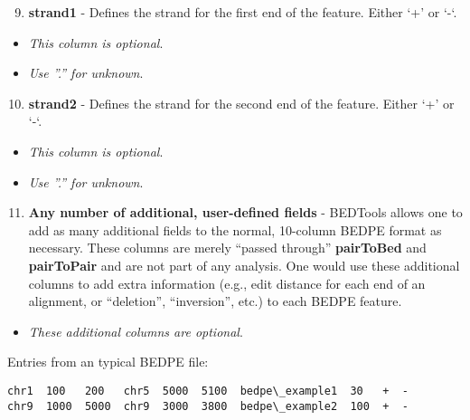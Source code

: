 \documentclass[letterpaper,10pt,english]{sphinxmanual}
\begin{document}
\begin{enumerate}
\setcounter{enumi}{8}
\item {} 
\textbf{strand1} - Defines the strand for the first end of the feature. Either `+' or `-`.

\end{enumerate}
\begin{itemize}
\item {} 
\emph{This column is optional}.

\item {} 
\emph{Use ''.'' for unknown}.

\end{itemize}
\begin{enumerate}
\setcounter{enumi}{9}
\item {} 
\textbf{strand2} - Defines the strand for the second end of the feature. Either `+' or `-`.

\end{enumerate}
\begin{itemize}
\item {} 
\emph{This column is optional}.

\item {} 
\emph{Use ''.'' for unknown}.

\end{itemize}
\begin{enumerate}
\setcounter{enumi}{10}
\item {} 
\textbf{Any number of additional, user-defined fields} - BEDTools allows one to add as many additional fields to the normal, 10-column BEDPE format as necessary. These columns are merely ``passed through'' \textbf{pairToBed} and \textbf{pairToPair} and are not part of any analysis. One would use these additional columns to add extra information (e.g., edit distance for each end of an alignment, or ``deletion'', ``inversion'', etc.) to each BEDPE feature.

\end{enumerate}
\begin{itemize}
\item {} 
\emph{These additional columns are optional}.

\end{itemize}

Entries from an typical BEDPE file:

\begin{Verbatim}[commandchars=\\\{\}]
chr1  100   200   chr5  5000  5100  bedpe\_example1  30   +  -
chr9  1000  5000  chr9  3000  3800  bedpe\_example2  100  +  -
\end{Verbatim}
\end{document}
